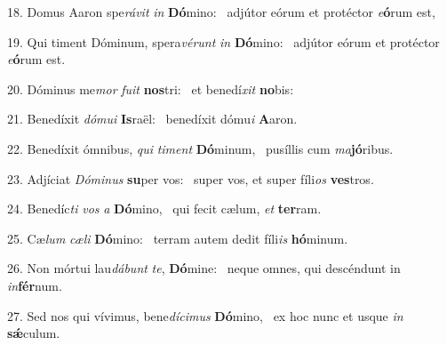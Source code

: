 18. Domus Aaron spe\textit{rá}\textit{vit} \textit{in} \textbf{Dó}mino: \ast\  adjútor eórum et protéctor \textit{e}\textbf{ó}rum est,\

19. Qui timent Dóminum, spera\textit{vé}\textit{runt} \textit{in} \textbf{Dó}mino: \ast\  adjútor eórum et protéctor \textit{e}\textbf{ó}rum est.\

20. Dóminus me\textit{mor} \textit{fu}\textit{it} \textbf{nos}tri: \ast\  et benedí\textit{xit} \textbf{no}bis:\

21. Benedíxit \textit{dó}\textit{mu}\textit{i} \textbf{Is}raël: \ast\  benedíxit dómu\textit{i} \textbf{A}aron.\

22. Benedíxit ómnibus, \textit{qui} \textit{ti}\textit{ment} \textbf{Dó}minum, \ast\  pusíllis cum \textit{ma}\textbf{jó}ribus.\

23. Adjíciat \textit{Dó}\textit{mi}\textit{nus} \textbf{su}per vos: \ast\  super vos, et super fíli\textit{os} \textbf{ves}tros.\

24. Benedíc\textit{ti} \textit{vos} \textit{a} \textbf{Dó}mino, \ast\  qui fecit cælum, \textit{et} \textbf{ter}ram.\

25. Cæ\textit{lum} \textit{cæ}\textit{li} \textbf{Dó}mino: \ast\  terram autem dedit fíli\textit{is} \textbf{hó}minum.\

26. Non mórtui lau\textit{dá}\textit{bunt} \textit{te}, \textbf{Dó}mine: \ast\  neque omnes, qui descéndunt in \textit{in}\textbf{fér}num.\

27. Sed nos qui vívimus, bene\textit{dí}\textit{ci}\textit{mus} \textbf{Dó}mino, \ast\  ex hoc nunc et usque \textit{in} \textbf{sǽ}culum.\

